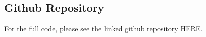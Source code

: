 \documentclass[conference]{IEEEtran}
\begin{document}
%




\newpage
\appendix

\printbibliography


\onecolumn
\subsection{Github Repository}

For the full code, please see the linked github repository \href{https://github.com/jjpendlebury/AINT308-Coursework}{HERE}.
\end{document}
